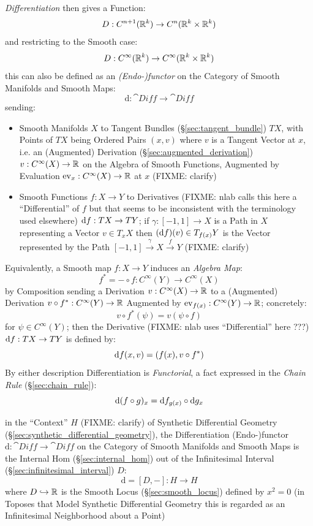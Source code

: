{\emph{Differentiation} then gives a Function:
\[
  D : C^{n+1}(\mathbb{R}^k) \rightarrow C^n(\mathbb{R}^k \times \mathbb{R}^k)
\]
and restricting to the Smooth case:
\[
  D : C^\infty(\mathbb{R}^k) \rightarrow C^\infty(\mathbb{R}^k \times \mathbb{R}^k)
\]
this can also be defined as an \emph{(Endo-)functor} on the Category of Smooth
Manifolds and Smooth Maps:
\[
  \mathrm{d} : \cat{Diff} \rightarrow \cat{Diff}
\]
sending:
\begin{itemize}
  \item Smooth Manifolds $X$ to Tangent Bundles (\S\ref{sec:tangent_bundle}) $T
    X$, with Points of $T X$ being Ordered Pairs $(x, v)$ where $v$ is a Tangent
    Vector at $x$, i.e. an (Augmented) Derivation
    (\S\ref{sec:augmented_derivation}) $v : C^\infty(X) \rightarrow \mathbb{R}$ on
    the Algebra of Smooth Functions, Augmented by Evaluation $\mathrm{ev}_x :
    C^\infty(X) \rightarrow \mathbb{R}$ at $x$ (FIXME: clarify)
  \item Smooth Functions $f : X \rightarrow Y$ to Derivatives (FIXME: nlab calls
    this here a ``Differential'' of $f$ but that seems to be inconsistent with
    the terminology used elsewhere) $\mathrm{d}f : TX \rightarrow TY$; if $\gamma
    : [-1,1] \rightarrow X$ is a Path in $X$ representing a Vector
    $v \in T_x{X}$ then $(\mathrm{d}f)(v) \in T_{f(x)}Y$ is the Vector represented
    by the Path $[-1, 1] \xrightarrow{\gamma} X \xrightarrow{f} Y$
    (FIXME: clarify)
\end{itemize}
Equivalently, a Smooth map $f : X \rightarrow Y$ induces an \emph{Algebra Map}:
\[
  f^* = - \circ f : C^\infty(Y) \rightarrow C^\infty(X)
\]
by Composition sending a Derivation $v : C^\infty(X) \rightarrow \mathbb{R}$ to a
(Augmented) Derivation $v \circ f^* : C^\infty(Y) \rightarrow \mathbb{R}$ Augmented
by $\mathrm{ev}_{f(x)} : C^\infty(Y) \rightarrow \mathbb{R}$; concretely:
\[
  v \circ f^*(\psi) = v(\psi \circ f)
\]
for $\psi \in C^\infty(Y)$; then the Derivative (FIXME: nlab uses
``Differential'' here ???) $\mathrm{d}f : T X \rightarrow T Y$ is defined by:
\[
  \mathrm{d}f(x,v) = (f(x), v \circ f^*)
\]
By either description Differentiation is \emph{Functorial}, a fact expressed in
the \emph{Chain Rule} (\S\ref{sec:chain_rule}):
\[
  \mathrm{d}(f \circ g)_x = \mathrm{d}f_{g(x)} \circ \mathrm{d}g_x
\]

in the ``Context'' $H$ (FIXME: clarify) of Synthetic Differential Geometry
(\S\ref{sec:synthetic_differential_geometry}), the Differentiation
(Endo-)functor $\mathrm{d} : \cat{Diff} \rightarrow \cat{Diff}$ on the Category
of Smooth Manifolds and Smooth Maps is the Internal Hom
(\S\ref{sec:internal_hom}) out of the Infinitesimal Interval
(\S\ref{sec:infinitesimal_interval}) $D$:
\[
  \mathrm{d} = [D,-] : H \rightarrow H
\]
where $D \hookrightarrow \mathbb{R}$ is the Smooth Locus (\S\ref{sec:smooth_locus})
defined by $x^2 = 0$ (in Toposes that Model Synthetic Differential Geometry this
is regarded as an Infinitesimal Neighborhood about a Point)

}
